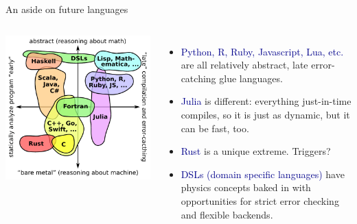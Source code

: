 \documentclass[aspectratio=169]{beamer}
\begin{document}
\begin{frame}{An aside on future languages}
\vspace{0.5 cm}
\begin{columns}
\includegraphics[width=\linewidth]{img/language-properties-grid.pdf}

\begin{itemize}
\item \textcolor{darkblue}{Python, R, Ruby, Javascript, Lua, etc.} are all relatively abstract, late error-catching glue languages. \\ 

\item<3-> \textcolor{darkblue}{Julia} is different: everything just-in-time compiles, so it is just as dynamic, but it can be fast, too.

\item<4-> \textcolor{darkblue}{Rust} is a unique extreme. Triggers?

\item<5-> \textcolor{darkblue}{DSLs (domain specific languages)} have physics concepts baked in with opportunities for strict error checking and flexible backends.

\end{itemize}
\end{columns}
\end{frame}
\end{document}
